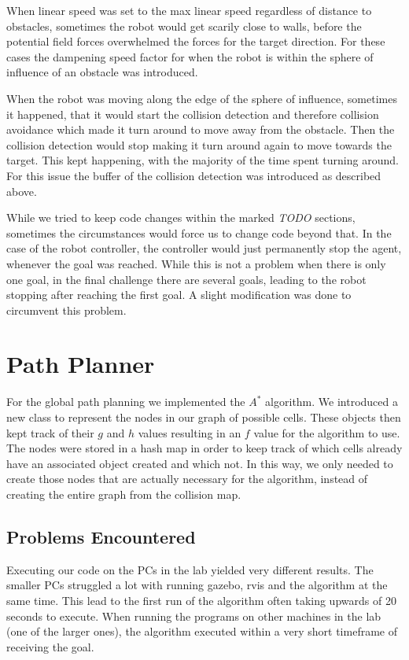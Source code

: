 \documentclass[
	fontsize=12pt,
	headings=small,
	parskip=half,           %
	bibliography=totoc,
	numbers=noenddot,       %
	open=any,               %
]{scrreprt}
\begin{document}
When linear speed was set to the max linear speed regardless of distance to obstacles, sometimes the robot would get scarily close to walls, before the potential field forces overwhelmed the forces for the target direction.
For these cases the dampening speed factor for when the robot is within the sphere of influence of an obstacle was introduced.

When the robot was moving along the edge of the sphere of influence, sometimes it happened, that it would start the collision detection and therefore collision avoidance which made it turn around to move away from the obstacle.
Then the collision detection would stop making it turn around again to move towards the target. This kept happening, with the majority of the time spent turning around.
For this issue the buffer of the collision detection was introduced as described above.

While we tried to keep code changes within the marked \emph{TODO} sections, sometimes the circumstances would force us to change code beyond that. In the case of the robot controller, the controller would just permanently stop the agent, whenever the goal was reached.
While this is not a problem when there is only one goal, in the final challenge there are several goals, leading to the robot stopping after reaching the first goal. A slight modification was done to circumvent this problem.


\chapter{Path Planner}
For the global path planning we implemented the $A^*$ algorithm.
We introduced a new class to represent the nodes in our graph of possible cells.
These objects then kept track of their $g$ and $h$ values resulting in an $f$ value for the algorithm to use. The nodes were stored in a hash map in order to keep track of which cells already have an associated object created and which not.
In this way, we only needed to create those nodes that are actually necessary for the algorithm, instead of creating the entire graph from the collision map.

\section{Problems Encountered}

Executing our code on the PCs in the lab yielded very different results. The smaller PCs struggled a lot with running gazebo, rvis and the algorithm at the same time.
This lead to the first run of the algorithm often taking upwards of 20 seconds to execute.
When running the programs on other machines in the lab (one of the larger ones), the algorithm executed within a very short timeframe of receiving the goal.
\end{document}
